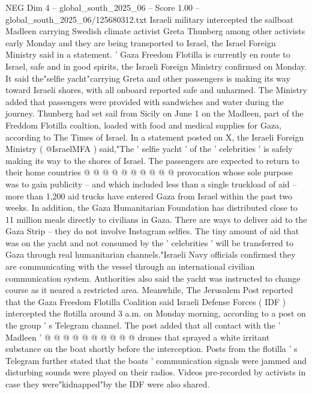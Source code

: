 \begin{textsample}{NEG Dim 4 – global\_south\_2025\_06 – Score 1.00 – global\_south\_2025\_06/125680312.txt}  \label{ex:f4_neg_105}
Israeli military intercepted the sailboat Madleen carrying Swedish climate activist Greta Thunberg among other activists early Monday and they are being transported to Israel, the Israel Foreign Ministry said in a statement. ' Gaza Freedom Flotilla is currently en route to Israel, safe and in good spirits, the Israeli Foreign Ministry confirmed on Monday.
It said the"selfie yacht"carrying Greta and other passengers is making its way toward Israeli shores, with all onboard reported safe and unharmed.
The Ministry added that passengers were provided with sandwiches and water during the journey.
Thunberg had set sail from Sicily on June 1 on the Madleen, part of the Freddom Flotilla coaltion, loaded with food and medical supplies for Gaza, according to The Times of Israel.
In a statement posted on X, the Israeli Foreign Ministry ( @IsraelMFA ) said,"The ' selfie yacht ' of the ' celebrities ' is safely making its way to the shores of Israel.
The passengers are expected to return to their home countries @ @ @ @ @ @ @ @ @ @ provocation whose sole purpose was to gain publicity -- and which included less than a single truckload of aid -- more than 1,200 aid trucks have entered Gaza from Israel within the past two weeks.
In addition, the Gaza Humanitarian Foundation has distributed close to 11 million meals directly to civilians in Gaza.
There are ways to deliver aid to the Gaza Strip -- they do not involve Instagram selfies.
The tiny amount of aid that was on the yacht and not consumed by the ' celebrities ' will be transferred to Gaza through real humanitarian channels."Israeli Navy officials confirmed they are communicating with the vessel through an international civilian communication system.
Authorities also said the yacht was instructed to change course as it neared a restricted area.
Meanwhile, The Jerusalem Post reported that the Gaza Freedom Flotilla Coalition said Israeli Defense Forces ( IDF ) intercepted the flotilla around 3 a.m. on Monday morning, according to a post on the group ' s Telegram channel.
The post added that all contact with the ' Madleen ' @ @ @ @ @ @ @ @ @ @ drones that sprayed a white irritant substance on the boat shortly before the interception.
Posts from the flotilla ' s Telegram further stated that the boats ' communication signals were jammed and disturbing sounds were played on their radios.
Videos pre-recorded by activists in case they were"kidnapped"by the IDF were also shared.

\end{textsample}
